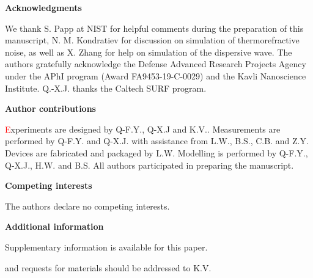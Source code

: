 \documentclass[noshowpacs,amsmath,
twocolumn,
superscriptaddress,
8pt,
aps,prb]{revtex4-2}
\begin{document}
\noindent\textbf{Acknowledgments}

\begin{footnotesize}
\noindent We thank S. Papp at NIST for helpful comments during the preparation of this manuscript, N. M. Kondratiev for discussion on simulation of thermorefractive noise, as well as X. Zhang for help on simulation of the dispersive wave. The authors gratefully acknowledge the Defense Advanced Research Projects Agency under the APhI program (Award FA9453-19-C-0029) and the Kavli Nanoscience Institute. Q.-X.J. thanks the Caltech SURF program.
\end{footnotesize}

\medskip

\noindent\textbf{Author contributions} 

\begin{footnotesize}
\noindent \textcolor{red} Experiments are designed by Q-F.Y., Q-X.J and K.V.. Measurements are performed by Q-F.Y. and Q-X.J. with assistance from L.W., B.S., C.B. and Z.Y. Devices are fabricated and packaged by L.W. Modelling is performed by Q-F.Y., Q-X.J., H.W. and B.S. All authors participated in preparing the manuscript.
\end{footnotesize}

\medskip

\noindent\textbf{Competing interests}

\begin{footnotesize}
\noindent The authors declare no competing interests.
\end{footnotesize}

\medskip

\noindent\textbf{Additional information}

\begin{footnotesize}
\noindent Supplementary information is available for this paper.

\medskip

 and requests for materials should be addressed to K.V.
\end{footnotesize}

\newpage
\end{document}
